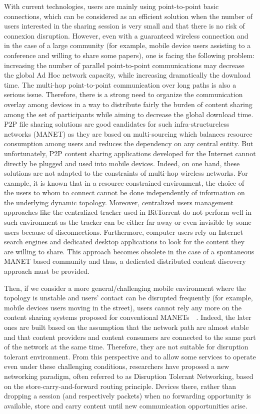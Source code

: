 With current technologies, users are mainly using point-to-point basic connections, which can be considered as an efficient solution when the number of users interested in the sharing session is very small and that there is no risk of connexion disruption. However, even with a guaranteed wireless connection and in the case of a large community (for example, mobile device users assisting to a conference and willing to share some papers), one is facing the following problem: increasing the number of parallel point-to-point communications may decrease the global Ad Hoc network capacity, while increasing dramatically the download time. The multi-hop point-to-point communication over long paths is also a serious issue. Therefore, there is a strong need to organize the communication overlay among devices in a way to distribute fairly the burden of content sharing among the set of participants while aiming to decrease the global download time. P2P file sharing solutions are good candidates for such infra-structureless networks (MANET) as they are based on multi-sourcing which balances resource consumption among users and reduces the dependency on any central entity. But unfortunately, P2P content sharing applications developed for the Internet cannot directly be plugged and used into mobile devices. Indeed, on one hand, these solutions are not adapted to the constraints of multi-hop wireless networks. For example, it is known that in a resource constrained environment, the choice of the users to whom to connect cannot be done independently of information on the underlying dynamic topology. Moreover, centralized users management approaches like the centralized tracker used in BitTorrent do not perform well in such environment as the tracker can be either far away or even invisible by some users because of disconnections. Furthermore, computer users rely on Internet search engines and dedicated desktop applications to look for the content they are willing to share. This approach becomes obsolete in the case of a spontaneous MANET based community and thus, a dedicated distributed content discovery approach must be provided. 

Then, if we consider a more general/challenging mobile environment where the topology is unstable and users' contact can be disrupted frequently (for example, mobile devices users moving in the street), users cannot rely any more on the content sharing systems proposed for conventional MANETs~\cite{BitHoc}~\cite{BlueTorrent}. Indeed, the later ones are built based on the assumption that the network path are almost stable and that content providers and content consumers are connected to the same part of the network at the same time. Therefore, they are not suitable for disruption tolerant environment. From this perspective and to allow some services to operate even under
these challenging conditions, researchers have proposed a new networking paradigm, often referred to as Disruption Tolerant Networking, based on the store-carry-and-forward routing principle. Devices there, rather than dropping a session (and respectively packets) when no forwarding opportunity is available, store and carry
content until new communication opportunities arise. 

